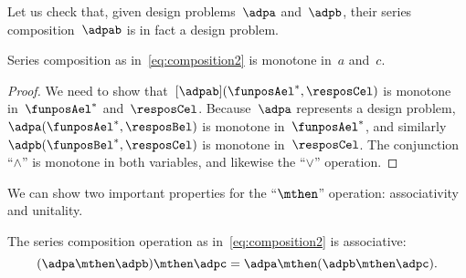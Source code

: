 Let us check that, given design problems~$\adpa$ and~$\adpb$, their series composition~$\adpab$ is in fact a design problem.
\begin{lemma}
    Series composition as in~\cref{eq:composition2} is monotone in~$a$ and~$c$.
\end{lemma}
\begin{proof}
    We need to show that~$[\adpab](\funposAel^*,\resposCel)$ is monotone in~$\funposAel^*$ and~$\resposCel$.
    Because~$\adpa$ represents a design problem,~$\adpa(\funposAel^*,\resposBel)$ is monotone in~$\funposAel^*$, and similarly~$\adpb(\funposBel^*,\resposCel)$ is monotone in~$\resposCel$.
    The conjunction ``$\wedge$'' is monotone in both variables, and likewise the ``$\vee$'' operation.
\end{proof}

We can show two important properties for the ``$\mthen$'' operation: associativity and unitality.
\begin{lemma}
    The series composition operation as in~\cref{eq:composition2} is associative:
    \begin{equation}
    (\adpa\mthen \adpb)
        \mthen \adpc = \adpa\mthen (\adpb\mthen \adpc).
    \end{equation}
\end{lemma}


